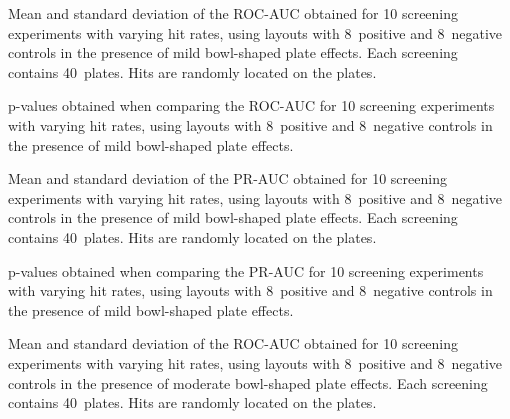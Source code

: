 \begin{table}[p]
    \centering
    \small
    
    \caption{Mean and standard deviation of the ROC-AUC obtained for 10 screening experiments with varying hit rates, using layouts with 8~positive and 8~negative controls in the presence of mild bowl-shaped plate effects. Each screening contains 40~plates. Hits are randomly located on the plates.}
    \label{tab:screening-roc_8-8-0.06}
\end{table}

\begin{table}[p]
    \centering
    \small
    
    \caption{p-values obtained when comparing the ROC-AUC for 10 screening experiments with varying hit rates, using layouts with 8~positive and 8~negative controls in the presence of mild bowl-shaped plate effects.}
    \label{tab:screening-roc_pvalues-8-8-0.06}
\end{table}

\begin{table}[p]
    \centering
    \small
    
    \caption{Mean and standard deviation of the PR-AUC obtained for 10 screening experiments with varying hit rates, using layouts with 8~positive and 8~negative controls in the presence of mild bowl-shaped plate effects. Each screening contains 40~plates. Hits are randomly located on the plates.}
    \label{tab:screening-pr_8-8-0.06}
\end{table}

\begin{table}[p]
    \centering
    \small
    
    \caption{p-values obtained when comparing the PR-AUC for 10 screening experiments with varying hit rates, using layouts with 8~positive and 8~negative controls in the presence of mild bowl-shaped plate effects.}
    \label{tab:screening-pr_pvalues-8-8-0.06}
\end{table}

\begin{table}[p]
    \centering
    \small
    
    \caption{Mean and standard deviation of the ROC-AUC obtained for 10 screening experiments with varying hit rates, using layouts with 8~positive and 8~negative controls in the presence of moderate bowl-shaped plate effects. Each screening contains 40~plates. Hits are randomly located on the plates.}
    \label{tab:screening-roc_8-8-0.1}
\end{table}

